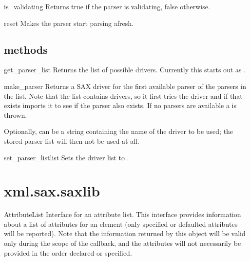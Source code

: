 \documentclass{howto}
\begin{document}
\begin{methoddesc}{is_validating}{}
Returns true if the parser is validating, false otherwise.
\end{methoddesc}

\begin{methoddesc}{reset}{}
Makes the parser start parsing afresh.
\end{methoddesc}

\subsection{ methods}

\begin{methoddesc}{get_parser_list}{}
Returns the list of possible drivers.  Currently this starts out as
.
\end{methoddesc}

\begin{methoddesc}{make_parser}{}
Returns a SAX driver for the first available parser of the parsers
in the list. Note that the list contains drivers, so it first tries
the driver and if that exists imports it to see if the parser also
exists. If no parsers are available a  is thrown.

Optionally,  can be a string containing the name of
the driver to be used; the stored parser list will then not be used at
all.  
\end{methoddesc}

\begin{methoddesc}{set_parser_list}{list}
Sets the driver list to .
\end{methoddesc}


\section{{xml.sax.saxlib}}

\begin{classdesc}{AttributeList}{}
Interface for an attribute list. This interface provides
    information about a list of attributes for an element (only
    specified or defaulted attributes will be reported). Note that the
    information returned by this object will be valid only during the
    scope of the  callback, and the
    attributes will not necessarily be provided in the order declared
    or specified.
\end{classdesc}
\end{document}
